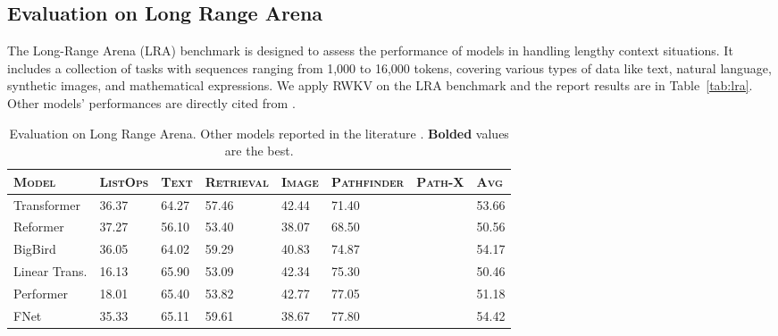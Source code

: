 \documentclass[11pt]{article}
\newcommand{\xmark}{\ding{55}}%
\begin{document}
\subsection{Evaluation on Long Range Arena}\label{lorfa}
The Long-Range Arena (LRA) benchmark \citep{tay2021long} is designed to assess the performance of models in handling lengthy context situations. It includes a collection of tasks with sequences ranging from 1,000 to 16,000 tokens, covering various types of data like text, natural language, synthetic images, and mathematical expressions. We apply RWKV on the LRA benchmark and the report results are in Table~\ref{tab:lra}. Other models' performances are directly cited from \citet{gu2022efficiently,alam2023recasting}.

\begin{table}[ht!]
  \small
  \caption{ Evaluation on Long Range Arena. Other models reported in the literature \citep{gu2022efficiently,alam2023recasting}. \textbf{Bolded} values are the best.
  }
    \centering
    \begin{tabular}{@{}llllllll@{}}
        \toprule
        \textsc{Model}        & \textsc{ListOps}  & \textsc{Text}     & \textsc{Retrieval} & \textsc{Image}    & \textsc{Pathfinder} & \textsc{Path-X} & \textsc{Avg}      \\
        \midrule
        Transformer           & 36.37             & 64.27             & 57.46              & 42.44             & 71.40               & \xmark          & 53.66             \\
        Reformer              & 37.27 & 56.10             & 53.40              & 38.07             & 68.50               & \xmark          & 50.56             \\
        BigBird               & 36.05             & 64.02             & 59.29              & 40.83             & 74.87               & \xmark          & 54.17             \\
        Linear Trans.         & 16.13             & 65.90 & 53.09              & 42.34             & 75.30               & \xmark          & 50.46             \\
        Performer             & 18.01             & 65.40             & 53.82              & 42.77             & 77.05               & \xmark          & 51.18             \\
        \midrule
        FNet                  & 35.33             & 65.11             & 59.61              & 38.67             & 77.80   & \xmark          & 54.42             \\

\end{tabular}
\end{table}
\end{document}
